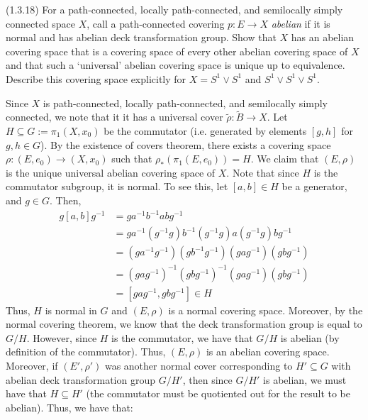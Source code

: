 \documentclass[12pt]{article}
\begin{document}


\begin{problem}{1}
    (1.3.18) For a path-connected, locally path-connected, and semilocally simply connected space $X$, call a path-connected covering $p \colon E \to X$ \emph{abelian} if it is normal and has abelian deck transformation group. Show that $X$ has an abelian covering space that is a covering space of every other abelian covering space of $X$ and that such a `universal' abelian covering space is unique up to equivalence. Describe this covering space explicitly for $X = S^1 \vee S^1$ and $S^1 \vee S^1 \vee S^1$. 
\end{problem}

\begin{solution}
    Since $X$ is path-connected, locally path-connected, and semilocally simply connected, we note that it it has a universal cover $\tilde\rho: \tilde{B} \to X$. Let $H \subseteq G := \pi_1(X, x_0)$ be the commutator (i.e. generated by elements $[g, h]$ for $g, h \in G$). By the existence of covers theorem, there exists a covering space $\rho: (E, e_0) \to (X, x_0)$ such that $\rho_*(\pi_1(E, e_0)) = H$. We claim that $(E, \rho)$ is the unique universal abelian covering space of $X$. \bbni
    Note that since $H$ is the commutator subgroup, it is normal. To see this, let $[a,b] \in H$ be a generator, and $g \in G$. Then, 
    \begin{align*}
        g[a,b]g^{-1} &= ga^{-1}b^{-1}abg^{-1} \\
        &= ga^{-1}(g^{-1}g)b^{-1}(g^{-1}g)a(g^{-1}g)bg^{-1} \\
        &= (ga^{-1}g^{-1})(gb^{-1}g^{-1})(gag^{-1})(gbg^{-1}) \\
        &= (gag^{-1})^{-1}(gbg^{-1})^{-1}(gag^{-1})(gbg^{-1}) \\
        &= [gag^{-1}, gbg^{-1}] \in H
    \end{align*}
    Thus, $H$ is normal in $G$ and $(E, \rho)$ is a normal covering space. \bbni
    Moreover, by the normal covering theorem, we know that the deck transformation group is equal to $G/H$. However, since $H$ is the commutator, we have that $G/H$ is abelian (by definition of the commutator). Thus, $(E, \rho)$ is an abelian covering space. \bbni
    Moreover, if $(E', \rho')$ was another normal cover corresponding to $H' \subseteq G$ with abelian deck transformation group $G/H'$, then since $G/H'$ is abelian, we must have that $H \subseteq H'$ (the commutator must be quotiented out for the result to be abelian). Thus, we have that:

\end{solution}
\end{document}

